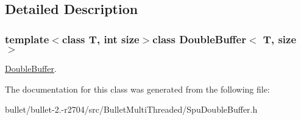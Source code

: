 \subsection{Detailed Description}
\subsubsection*{template$<$class T, int size$>$class Double\+Buffer$<$ T, size $>$}

\hyperlink{class_double_buffer}{Double\+Buffer}. 

The documentation for this class was generated from the following file\+:\begin{DoxyCompactItemize}
\item 
bullet/bullet-\/2.-\/r2704/src/\+Bullet\+Multi\+Threaded/Spu\+Double\+Buffer.\+h\end{DoxyCompactItemize}
